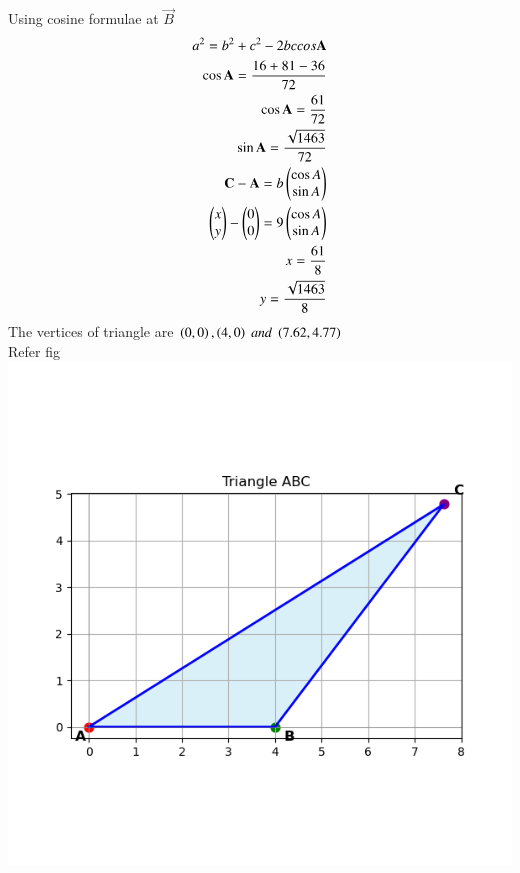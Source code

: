 \documentclass[journal]{IEEEtran}
\begin{document}
Using cosine formulae at $\vec{B}$ 
\begin{align}
a^2=b^2+c^2-2bccos\mathbf{A}\\
\cos{\mathbf{A}}=\frac{16+81-36}{72}\\
\cos{\mathbf{A}}=\frac{61}{72}\\
\sin{\mathbf{A}}=\frac{\sqrt{1463}}{72}\\
\mathbf{C}-\mathbf{A}=b\begin{pmatrix}\cos{A}\\ \sin{A}\end{pmatrix}\\
\begin{pmatrix}x\\y\end{pmatrix}-\begin{pmatrix}0\\0\end{pmatrix}=9\begin{pmatrix}\cos{A}\\ \sin{A}\end{pmatrix}\\
x=\frac{61}{8}\\
y=\frac{\sqrt{1463}}{8}
\end{align}
The vertices of triangle are $\left(0,0\right),\left(4,0\right)\; and\; \left(7.62,4.77\right) $\\
Refer fig
\centering
    \includegraphics[width=\columnwidth, height=0.8\textheight, keepaspectratio]{figs/Figure_5.png}     
\end{document}
